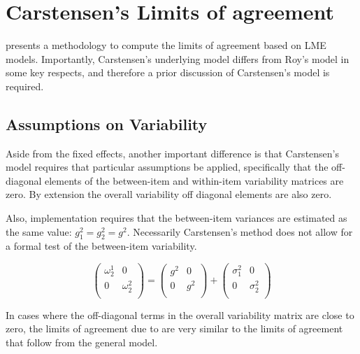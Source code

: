 \documentclass[12pt, a4paper]{report}
\theoremstyle{plain}
\theoremstyle{definition}
\theoremstyle{remark}
\begin{document}
			
\section{Carstensen's Limits of agreement}
\citet{BXC2008} presents a methodology to compute the limits of
agreement based on LME models. Importantly, Carstensen's underlying model differs from Roy's model in some key respects, and therefore a prior discussion of Carstensen's model is required.



\subsection{Assumptions on Variability}

Aside from the fixed effects, another important difference is that Carstensen's model requires that particular assumptions be applied, specifically that the off-diagonal elements of the between-item
and within-item variability matrices are zero. By extension the
overall variability off diagonal elements are also zero.

Also, implementation requires that the between-item variances are
estimated as the same value: $g^2_1 = g^2_2 = g^2$. Necessarily
Carstensen's method does not allow for a formal test of the
between-item variability.

\[\left(\begin{array}{cc}
\omega^1_2  & 0 \\
0 & \omega^2_2 \\
\end{array}  \right)
=  \left(
\begin{array}{cc}
g^2  & 0 \\
0 & g^2 \\
\end{array} \right)+
\left(
\begin{array}{cc}
\sigma^2_1  & 0 \\
0 & \sigma^2_2 \\
\end{array}\right)
\]

In cases where the off-diagonal terms in the overall variability
matrix are close to zero, the limits of agreement due to
\citet{bxc2008} are very similar to the limits of agreement that
follow from the general model.

\newpage

%
\end{document}
